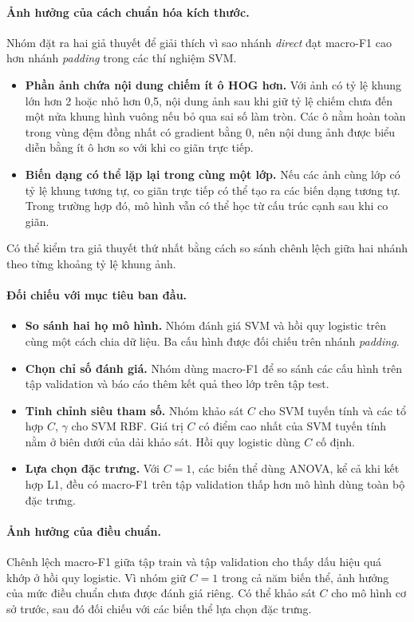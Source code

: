 \paragraph{Ảnh hưởng của cách chuẩn hóa kích thước.} Nhóm đặt ra hai giả thuyết để giải thích vì sao nhánh \emph{direct} đạt macro-F1 cao hơn nhánh \emph{padding} trong các thí nghiệm SVM.
\begin{itemize}
  \item \textbf{Phần ảnh chứa nội dung chiếm ít ô HOG hơn.} Với ảnh có tỷ lệ khung lớn hơn 2 hoặc nhỏ hơn 0,5, nội dung ảnh sau khi giữ tỷ lệ chiếm chưa đến một nửa khung hình vuông nếu bỏ qua sai số làm tròn. Các ô nằm hoàn toàn trong vùng đệm đồng nhất có gradient bằng 0, nên nội dung ảnh được biểu diễn bằng ít ô hơn so với khi co giãn trực tiếp.
  \item \textbf{Biến dạng có thể lặp lại trong cùng một lớp.} Nếu các ảnh cùng lớp có tỷ lệ khung tương tự, co giãn trực tiếp có thể tạo ra các biến dạng tương tự. Trong trường hợp đó, mô hình vẫn có thể học từ cấu trúc cạnh sau khi co giãn.
\end{itemize}
Có thể kiểm tra giả thuyết thứ nhất bằng cách so sánh chênh lệch giữa hai nhánh theo từng khoảng tỷ lệ khung ảnh.

\paragraph{Đối chiếu với mục tiêu ban đầu.}
\begin{itemize}
  \item \textbf{So sánh hai họ mô hình.} Nhóm đánh giá SVM và hồi quy logistic trên cùng một cách chia dữ liệu. Ba cấu hình được đối chiếu trên nhánh \emph{padding}.
  \item \textbf{Chọn chỉ số đánh giá.} Nhóm dùng macro-F1 để so sánh các cấu hình trên tập validation và báo cáo thêm kết quả theo lớp trên tập test.
  \item \textbf{Tinh chỉnh siêu tham số.} Nhóm khảo sát $C$ cho SVM tuyến tính và các tổ hợp $C$, $\gamma$ cho SVM RBF. Giá trị $C$ có điểm cao nhất của SVM tuyến tính nằm ở biên dưới của dải khảo sát. Hồi quy logistic dùng $C$ cố định.
  \item \textbf{Lựa chọn đặc trưng.} Với $C = 1$, các biến thể dùng ANOVA, kể cả khi kết hợp L1, đều có macro-F1 trên tập validation thấp hơn mô hình dùng toàn bộ đặc trưng.
\end{itemize}

\paragraph{Ảnh hưởng của điều chuẩn.} Chênh lệch macro-F1 giữa tập train và tập validation cho thấy dấu hiệu quá khớp ở hồi quy logistic. Vì nhóm giữ $C = 1$ trong cả năm biến thể, ảnh hưởng của mức điều chuẩn chưa được đánh giá riêng. Có thể khảo sát $C$ cho mô hình cơ sở trước, sau đó đối chiếu với các biến thể lựa chọn đặc trưng.

